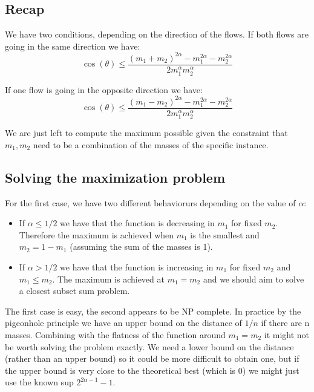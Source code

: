 \documentclass{article}
\begin{document}
    \subsection{Recap}
    We have two conditions, depending on the direction of the flows.
    If both flows are going in the same direction we have:
    \begin{equation}
        \cos(\theta) \le \frac{(m_1 + m_2) ^ {2\alpha} - m_1^{2\alpha} - m_2^{2\alpha}}{2m_1^\alpha m_2^\alpha}
        \label{eq:bound1}
    \end{equation}

    If one flow is going in the opposite direction we have:
    \begin{equation}
        \cos(\theta) \le \frac{(m_1 - m_2) ^ {2\alpha} - m_1^{2\alpha} - m_2^{2\alpha}}{2m_1^\alpha m_2^\alpha}
        \label{eq:bound2}
    \end{equation}

    We are just left to compute the maximum possible given the constraint that $m_1, m_2$ need to be a combination of the masses
    of the specific instance.

    \subsection{Solving the maximization problem}

    For the first case, we have two different behaviorurs depending on the value of $\alpha$:
    \begin{itemize}
        \item If $\alpha \le 1/2$ we have that the function is decreasing in $m_1$ for fixed $m_2$. Therefore the maximum is achieved when $m_1$ is the smallest and $m_2 = 1 - m_1$ (assuming the sum of the masses is 1).
        \item If $\alpha > 1/2$ we have that the function is increasing in $m_1$ for fixed $m_2$ and $m_1 \le m_2$. The maximum is achieved at $m_1 = m_2$ and we should aim to solve a closest subset sum problem.
    \end{itemize}

    The first case is easy, the second appears to be NP complete. In practice by the pigeonhole principle we have an upper bound on the distance of
    $1/n$ if there are n masses. Combining with the flatness of the function around $m_1 = m_2$ it might not be worth solving the problem exactly.
    We need a lower bound on the distance (rather than an upper bound) so it could be more difficult to obtain one, but if the upper bound is very close
    to the theoretical best (which is 0) we might just use the known sup $2^{2\alpha-1}-1$.
\end{document}
